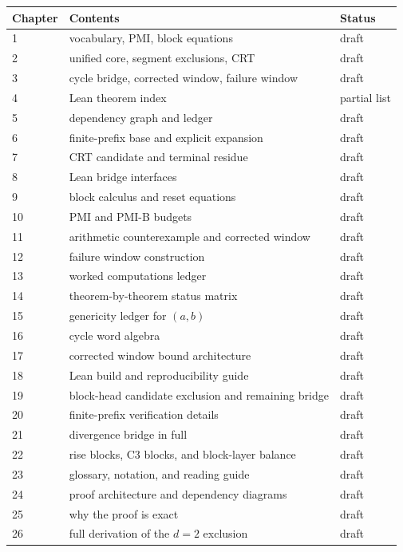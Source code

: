 \begin{center}
\small
\begin{tabular}{@{}p{}p{}p{}@{}}
\toprule
Chapter & Contents & Status \\
\midrule
1 & vocabulary, PMI, block equations & draft \\
2 & unified core, segment exclusions, CRT & draft \\
3 & cycle bridge, corrected window, failure window & draft \\
4 & Lean theorem index & partial list \\
5 & dependency graph and ledger & draft \\
6 & finite-prefix base and explicit expansion & draft \\
7 & CRT candidate and terminal residue & draft \\
8 & Lean bridge interfaces & draft \\
9 & block calculus and reset equations & draft \\
10 & PMI and PMI-B budgets & draft \\
11 & arithmetic counterexample and corrected window & draft \\
12 & failure window construction & draft \\
13 & worked computations ledger & draft \\
14 & theorem-by-theorem status matrix & draft \\
15 & genericity ledger for $(a,b)$ & draft \\
16 & cycle word algebra & draft \\
17 & corrected window bound architecture & draft \\
18 & Lean build and reproducibility guide & draft \\
19 & block-head candidate exclusion and remaining bridge & draft \\
20 & finite-prefix verification details & draft \\
21 & divergence bridge in full & draft \\
22 & rise blocks, C3 blocks, and block-layer balance & draft \\
23 & glossary, notation, and reading guide & draft \\
24 & proof architecture and dependency diagrams & draft \\
25 & why the proof is exact & draft \\
26 & full derivation of the $d=2$ exclusion & draft \\

\end{tabular}
\end{center}
